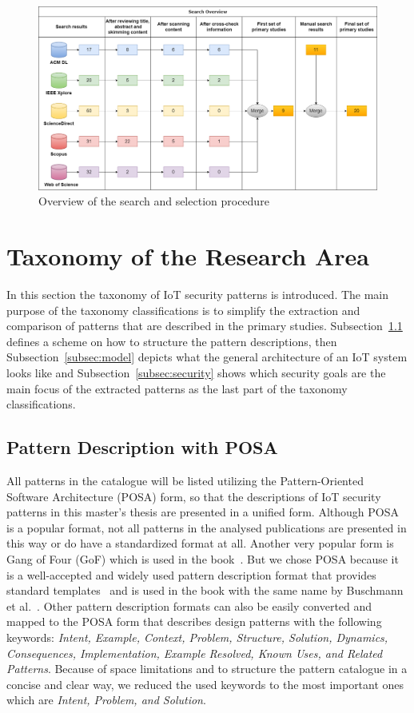 \begin{figure}[ht]
	\includegraphics[scale=0.3]{img/search}
	\centering
	\caption{Overview of the search and selection procedure}
	\label{fig:search-overview}
\end{figure}


\section{Taxonomy of the Research Area}\label{sec:taxonomy}
In this section the taxonomy of IoT security patterns is introduced. The main purpose of the taxonomy classifications is to simplify the extraction and comparison of patterns that are described in the primary studies. Subsection~\ref{subsec:posa} defines a scheme on how to structure the pattern descriptions, then Subsection~\ref{subsec:model} depicts what the general architecture of an IoT system looks like and Subsection~\ref{subsec:security} shows which security goals are the main focus of the extracted patterns as the last part of the taxonomy classifications.

\subsection{Pattern Description with POSA}\label{subsec:posa}
All patterns in the catalogue will be listed utilizing the Pattern-Oriented Software Architecture (POSA) form, so that the descriptions of IoT security patterns in this master's thesis are presented in a unified form. Although POSA is a popular format, not all patterns in the analysed publications are presented in this way or do have a standardized format at all. Another very popular form is Gang of Four (GoF) which is used in the  book~\cite{Gamma1994}. But we chose POSA because it is a well-accepted and widely used pattern description format that provides standard templates~\cite{Bunke2014} and is used in the book with the same name by Buschmann et al.~\cite{Buschmann1996}. Other pattern description formats can also be easily converted and mapped to the POSA form that describes design patterns with the following keywords: \emph{Intent, Example, Context, Problem, Structure, Solution, Dynamics, Consequences, Implementation, Example Resolved, Known Uses, and Related Patterns}. Because of space limitations and to structure the pattern catalogue in a concise and clear way, we reduced the used keywords to the most important ones which are \emph{Intent, Problem, and Solution}.

